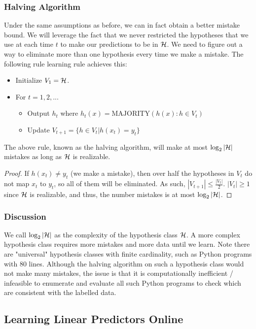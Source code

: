\documentclass{article}
\begin{document}
\subsubsection{Halving Algorithm}
Under the same assumptions as before, we can in fact obtain a better mistake bound. We will leverage the fact that we never restricted the hypotheses that we use at each time $t$ to make our predictions to be in $\mathcal{H}$. We need to figure out a way to eliminate more than one hypothesis every time we make a mistake. The following rule learning rule achieves this:

\begin{itemize}
    \item Initialize $V_1 = \mathcal{H}$.
    \item For $t = 1, 2,...$
    \begin{itemize}
        \item Output $h_t$ where $h_t(x) = \text{MAJORITY}(h(x): h \in V_t)$
        \item Update $V_{t+1} = \{h \in V_t | h(x_t) = y_t\}$
    \end{itemize}
\end{itemize}

\begin{proposition}
The above rule, known as the halving algorithm, will make at most $\log_2 |\mathcal{H}|$ mistakes as long as $\mathcal{H}$ is realizable.
\end{proposition}
\begin{proof}
If $h(x_t) \neq y_t$ (we make a mistake), then over half the hypotheses in $V_t$ do not map $x_t$ to $y_t$, so all of them will be eliminated. As such, $|V_{t+1}| \leq \frac{|V_t|}{2}$. $|V_t| \geq 1$ since $\mathcal{H}$ is realizable, and thus, the number mistakes is at most $\log_2 |\mathcal{H}|$.
\end{proof}
\subsubsection{Discussion}
We call $\log_2|\mathcal{H}|$ as the complexity of the hypothesis class $\mathcal{H}$. A more complex hypothesis class requires more mistakes and more data until we learn. Note there are "universal" hypothesis classes with finite cardinality, such as Python programs with 80 lines. Although the halving algorithm on such a hypothesis class would not make many mistakes, the issue is that it is computationally inefficient / infeasible to enumerate and evaluate all such Python programs to check which are consistent with the labelled data.
\subsection{Learning Linear Predictors Online}
\end{document}

